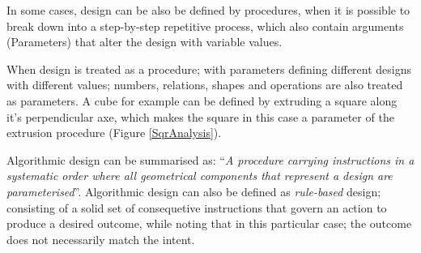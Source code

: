 In some cases, design can be also be defined by procedures, when it is possible to break down into a step-by-step repetitive process, which also contain arguments (Parameters) that alter the design with variable values.

When design is treated as a procedure; with parameters defining different designs with different values; numbers, relations, shapes and operations are also treated as parameters. A cube for example can be defined by extruding a square along it's perpendicular axe, which makes the square in this case a parameter of the extrusion procedure (Figure \ref{SqrAnalysis}).

Algorithmic design can be summarised as: ``\emph{A procedure carrying instructions in a systematic order where all geometrical components that represent a design are parameterised}''\cite{hernandez06}. Algorithmic design can also be defined as \emph{rule-based} design; consisting of a solid set of consequetive instructions that govern an action to produce a desired outcome, while noting that in this particular case; the outcome does not necessarily match the intent. \label{AlgoGeoModel}
